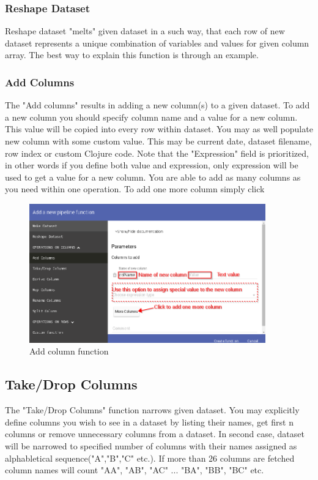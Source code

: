 \documentclass[USenglish]{article}
\begin{document}
\subsubsection{Reshape Dataset}
Reshape dataset "melts" given dataset in a such way, that each row of new dataset represents a unique combination of variables and values for given column array. The best way to explain this function is through an example. 


\subsubsection{Add Columns \label{addcolumns}}

The "Add columns"  results in adding a new column(s) to a given dataset. To add a new column you should specify column name and a value for a new column. This value will be copied into every row within dataset. You may as well populate new column with some custom value. This may be current date, dataset filename, row index or custom Clojure code. Note that the "Expression" field is prioritized, in other words if you define both value and expression, only expression will be used to get a value for a new column.
You are able to add as many columns as you need within one operation. To add one more column simply click 

 \begin{center}
\begin{figure}[!htbp]
\centering
\includegraphics[height=6cm] {addcolumnf1.png}
 \caption{Add column function \label{meta}}
\end{figure}
\end{center}


\subsection{Take/Drop Columns}

The "Take/Drop Columns" function narrows given dataset. You may explicitly define columns you wish to see in a dataset by listing their names, get first n columns or remove unnecessary columns from a dataset. In second case, dataset will be narrowed to specified number of columns with their names assigned as alphabletical sequence("A","B","C" etc.). If more than 26 columns are fetched column names will count "AA", "AB", "AC" ... "BA", "BB", "BC" etc.
\end{document}
